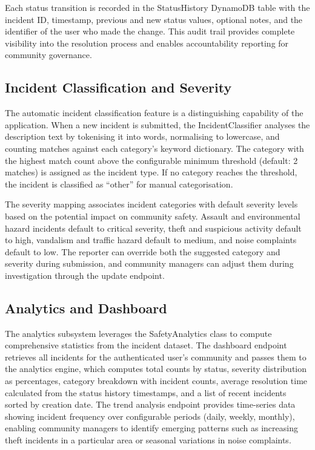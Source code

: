\documentclass[conference]{IEEEtran}
\begin{document}
Each status transition is recorded in the StatusHistory DynamoDB table with the incident ID, timestamp, previous and new status values, optional notes, and the identifier of the user who made the change. This audit trail provides complete visibility into the resolution process and enables accountability reporting for community governance.

\subsection{Incident Classification and Severity}

The automatic incident classification feature is a distinguishing capability of the application. When a new incident is submitted, the IncidentClassifier analyses the description text by tokenising it into words, normalising to lowercase, and counting matches against each category's keyword dictionary. The category with the highest match count above the configurable minimum threshold (default: 2 matches) is assigned as the incident type. If no category reaches the threshold, the incident is classified as ``other'' for manual categorisation.

The severity mapping associates incident categories with default severity levels based on the potential impact on community safety. Assault and environmental hazard incidents default to critical severity, theft and suspicious activity default to high, vandalism and traffic hazard default to medium, and noise complaints default to low. The reporter can override both the suggested category and severity during submission, and community managers can adjust them during investigation through the update endpoint.

\subsection{Analytics and Dashboard}

The analytics subsystem leverages the SafetyAnalytics class to compute comprehensive statistics from the incident dataset. The dashboard endpoint retrieves all incidents for the authenticated user's community and passes them to the analytics engine, which computes total counts by status, severity distribution as percentages, category breakdown with incident counts, average resolution time calculated from the status history timestamps, and a list of recent incidents sorted by creation date. The trend analysis endpoint provides time-series data showing incident frequency over configurable periods (daily, weekly, monthly), enabling community managers to identify emerging patterns such as increasing theft incidents in a particular area or seasonal variations in noise complaints.
\end{document}
